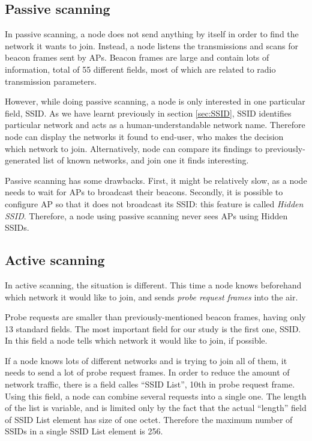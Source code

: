 \documentclass[12pt,a4paper,oneside,pdftex]{report}
\begin{document}
\subsection{Passive scanning}
\label{subsec:passive_scanning}

In passive scanning, a node does not send anything by itself in order to find the network it wants to join. Instead, a node listens the transmissions and scans for beacon frames sent by APs. Beacon frames are large and contain lots of information, total of 55 different fields, most of which are related to radio transmission parameters.

However, while doing passive scanning, a node is only interested in one particular field, SSID. As we have learnt previously in section \ref{sec:SSID}, SSID identifies particular network and acts as a human-understandable network name. Therefore node can display the networks it found to end-user, who makes the decision which network to join. Alternatively, node can compare its findings to previously-generated list of known networks, and join one it finds interesting.

Passive scanning has some drawbacks. First, it might be relatively slow, as a node needs to wait for APs to broadcast their beacons. Secondly, it is possible to configure AP so that it does not broadcast its SSID: this feature is called \emph{Hidden SSID}. Therefore, a node using passive scanning never sees APs using Hidden SSIDs.

\subsection{Active scanning}
\label{subsec:active_scanning}

In active scanning, the situation is different. This time a node knows beforehand which network it would like to join, and sends \emph{probe request frames} into the air. 

Probe requests are smaller than previously-mentioned beacon frames, having only 13 standard fields. The most important field for our study is the first one, SSID. In this field a node tells which network it would like to join, if possible. 

If a node knows lots of different networks and is trying to join all of them, it needs to send a lot of probe request frames. In order to reduce the amount of network traffic, there is a field calles ``SSID List'', 10th in probe request frame. Using this field, a node can combine several requests into a single one. The length of the list is variable, and is limited only by the fact that the actual ``length'' field of SSID List element has size of one octet. Therefore the maximum number of SSIDs in a single SSID List element is 256.
\end{document}
